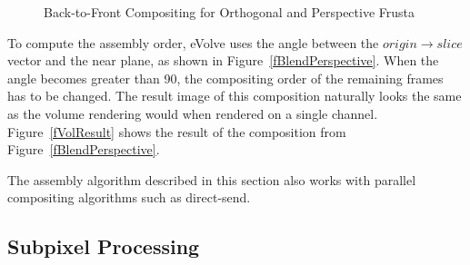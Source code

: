 \documentclass[10pt,a4]{scrartcl}
\newcommand{\fig}[1]{Figure~\ref{#1}}
\begin{document}
\begin{figure}[h!t]
  \hfil
  {\caption{\label{fBlend}Back-to-Front Com\-po\-siting for
      Orthogonal and Perspective Frusta}}
\end{figure}

To compute the assembly order, \textsf{eVolve} uses the angle between
the $origin \rightarrow slice$ vector and the near plane, as shown in
\fig{fBlendPerspective}. When the angle becomes greater than
90\textdegree, the compositing order of the remaining frames has to be
changed. The result image of this composition naturally looks the same
as the volume rendering would when rendered on a single
channel. \fig{fVolResult} shows the result of the composition from
\fig{fBlendPerspective}.

The assembly algorithm described in this section also works with parallel
compositing algorithms such as direct-send. 


\subsection{\label{sFSAA}Subpixel Processing}
\end{document}
